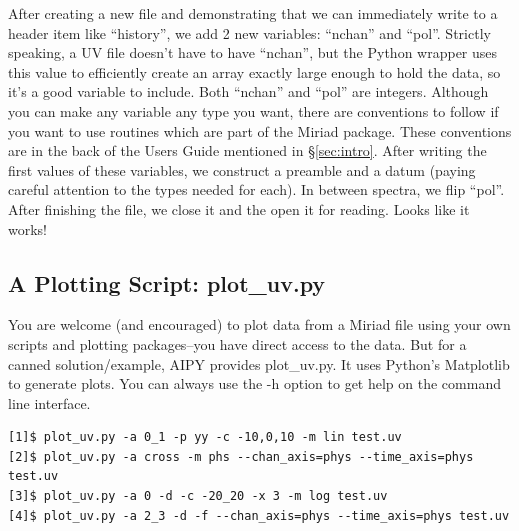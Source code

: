 After creating a new file and demonstrating that we can immediately write to a
header item like ``history'', we add 2 new variables: ``nchan'' and ``pol''.
Strictly speaking, a UV file doesn't have to have ``nchan'', but the Python
wrapper uses this value to efficiently create an array exactly large enough to
hold the data, so it's a good variable to include.  Both ``nchan'' and ``pol''
are integers.  Although you can make any variable any type you want, there are
conventions to follow if you want to use routines which are part of the Miriad
package.  These conventions are in the back of the Users Guide mentioned in
\S\ref{sec:intro}.  After writing the first values of these variables, we
construct a preamble and a datum (paying careful attention to the types needed
for each).  In between spectra, we flip ``pol''.  After finishing the file,
we close it and the open it for reading.  Looks like it works!

\subsection{A Plotting Script: plot\_uv.py}
\label{sec:plot_uv}

You are welcome (and encouraged) to plot data from a Miriad file using your
own scripts and plotting packages--you have direct access to the data.  But
for a canned solution/example, AIPY provides plot\_uv.py.  It uses Python's
Matplotlib to generate plots.  You can always use the -h option to get
help on the command line interface.

\begin{verbatim}
[1]$ plot_uv.py -a 0_1 -p yy -c -10,0,10 -m lin test.uv
[2]$ plot_uv.py -a cross -m phs --chan_axis=phys --time_axis=phys test.uv
[3]$ plot_uv.py -a 0 -d -c -20_20 -x 3 -m log test.uv
[4]$ plot_uv.py -a 2_3 -d -f --chan_axis=phys --time_axis=phys test.uv
\end{verbatim}

